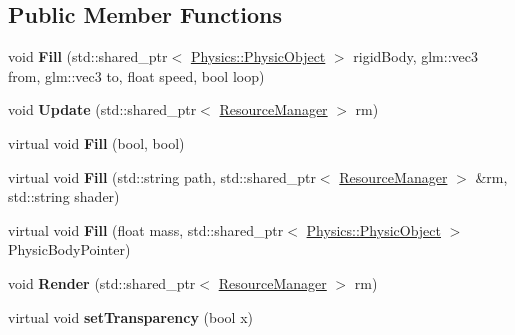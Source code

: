 \subsection*{Public Member Functions}
\begin{DoxyCompactItemize}
\item 
void {\bfseries Fill} (std\+::shared\+\_\+ptr$<$ \hyperlink{class_physics_1_1_physic_object}{Physics\+::\+Physic\+Object} $>$ rigid\+Body, glm\+::vec3 from, glm\+::vec3 to, float speed, bool loop)\hypertarget{class_component_1_1_movement_component_aed40e730e193cbc048091a97081d0aea}{}\label{class_component_1_1_movement_component_aed40e730e193cbc048091a97081d0aea}

\item 
void {\bfseries Update} (std\+::shared\+\_\+ptr$<$ \hyperlink{class_resource_manager}{Resource\+Manager} $>$ rm)\hypertarget{class_component_1_1_movement_component_af4ca369e680ddaa9fc5981e8c855537c}{}\label{class_component_1_1_movement_component_af4ca369e680ddaa9fc5981e8c855537c}

\item 
virtual void {\bfseries Fill} (bool, bool)\hypertarget{class_component_1_1_movement_component_a6411cd31299815fc2bff24a015109b8e}{}\label{class_component_1_1_movement_component_a6411cd31299815fc2bff24a015109b8e}

\item 
virtual void {\bfseries Fill} (std\+::string path, std\+::shared\+\_\+ptr$<$ \hyperlink{class_resource_manager}{Resource\+Manager} $>$ \&rm, std\+::string shader)\hypertarget{class_component_1_1_movement_component_a80c6faeb95ee6937eb059a089e62fb59}{}\label{class_component_1_1_movement_component_a80c6faeb95ee6937eb059a089e62fb59}

\item 
virtual void {\bfseries Fill} (float mass, std\+::shared\+\_\+ptr$<$ \hyperlink{class_physics_1_1_physic_object}{Physics\+::\+Physic\+Object} $>$ Physic\+Body\+Pointer)\hypertarget{class_component_1_1_movement_component_a9d8d787ca02445eb337e38d181500242}{}\label{class_component_1_1_movement_component_a9d8d787ca02445eb337e38d181500242}

\item 
void {\bfseries Render} (std\+::shared\+\_\+ptr$<$ \hyperlink{class_resource_manager}{Resource\+Manager} $>$ rm)\hypertarget{class_component_1_1_movement_component_ab3c644588ecbd90b2b61b90eb3170c4c}{}\label{class_component_1_1_movement_component_ab3c644588ecbd90b2b61b90eb3170c4c}

\item 
virtual void {\bfseries set\+Transparency} (bool x)\hypertarget{class_component_1_1_movement_component_a13dd0d14196f5dcb87862e4e65d2f4fb}{}\label{class_component_1_1_movement_component_a13dd0d14196f5dcb87862e4e65d2f4fb}

\end{DoxyCompactItemize}
